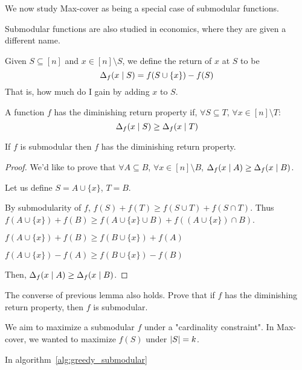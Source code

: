     We now study Max-cover as being a special case of submodular functions.

    Submodular functions are also studied in economics, where they are given a different name.
    \begin{definition}
        Given $S \subseteq [n]$ and $x \in [n] \setminus S$, we define the return of $x$ at $S$ to be
        \[ \Delta_f (x \; \vert \; S) = f(S \cup \{ x \}) - f(S) \]
        That is, how much do I gain by adding $x$ to $S$.
    \end{definition}

    A function $f$ has the diminishing return property if, $\forall S \subseteq T$, $\forall x \in [n] \setminus T$:
    \[ \Delta_f(x \; \vert \; S) \geq \Delta_f(x \; \vert \; T) \]

    \begin{lemma}
        If $f$ is submodular then $f$ has the diminishing return property.
    \end{lemma}

    \begin{proof}
        We'd like to prove that $\forall A \subseteq B$, $\forall x \in [n] \setminus B$, $\Delta_f(x \; \vert \; A) \geq \Delta_f(x \; \vert \; B)$.

        Let us define $S = A \cup \{x\}$, $T = B$.

        By submodularity of $f$, $f(S) + f(T) \geq f(S \cup T) + f(S \cap T)$.
        Thus $f(A \cup \{x\}) + f(B) \geq f(A \cup \{x\} \cup B) + f((A \cup \{x\}) \cap B)$.

        $f(A \cup \{x\}) + f(B) \geq f(B \cup \{x\}) + f(A)$

        $f(A \cup \{x\}) - f(A) \geq f(B \cup \{x\}) - f(B)$

        Then, $\Delta_f(x \; \vert \; A) \geq \Delta_f(x \; \vert \; B)$.
    \end{proof}

    \begin{exercise}
        The converse of previous lemma also holds.
        Prove that if $f$ has the diminishing return property, then $f$ is submodular.
    \end{exercise}

    We aim to maximize a submodular $f$ under a "cardinality constraint".
    In Max-cover, we wanted to maximize $f(S)$ under $\vert S \vert = k$.

    In algorithm~\ref{alg:greedy_submodular}

    

